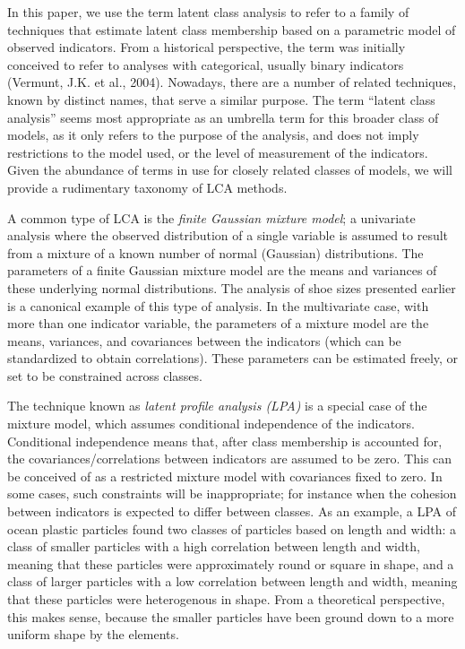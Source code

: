 \documentclass[
  ,man,floatsintext]{apa6}
\begin{document}
In this paper, we use the term latent class analysis to refer to
a family of techniques that estimate latent class membership
based on a parametric model of observed indicators.
From a historical perspective, the term was initially conceived to
refer to analyses with categorical, usually binary indicators (Vermunt, J.K. et al., 2004).
Nowadays, there are a number of related techniques,
known by distinct names, that serve a similar purpose.
The term ``latent class analysis'' seems most appropriate
as an umbrella term for this broader class of models,
as it only refers to the purpose of the analysis,
and does not imply restrictions to the model used,
or the level of measurement of the indicators.
Given the abundance of terms in use for closely related classes of models,
we will provide a rudimentary taxonomy of LCA methods.

A common type of LCA is the \emph{finite Gaussian mixture model};
a univariate analysis where the observed distribution of a single variable
is assumed to result from a mixture of a known number of normal (Gaussian) distributions.
The parameters of a finite Gaussian mixture model are
the means and variances of these underlying normal distributions.
The analysis of shoe sizes presented earlier is a canonical example of this type of analysis.
In the multivariate case, with more than one indicator variable,
the parameters of a mixture model are the means, variances, and covariances
between the indicators (which can be standardized to obtain correlations).
These parameters can be estimated freely, or set to be constrained across classes.

The technique known as \emph{latent profile analysis (LPA)} is a special case of the mixture model,
which assumes conditional independence of the indicators.
Conditional independence means that, after class membership is accounted for,
the covariances/correlations between indicators are assumed to be zero.
This can be conceived of as a restricted mixture model with covariances fixed to zero.
In some cases, such constraints will be inappropriate;
for instance when the cohesion between indicators is expected to differ between classes.
As an example, a LPA of ocean plastic particles
found two classes of particles based on length and width:
a class of smaller particles with a high correlation between length and width,
meaning that these particles were approximately round or square in shape,
and a class of larger particles with a low correlation between length and width,
meaning that these particles were heterogenous in shape.
From a theoretical perspective, this makes sense,
because the smaller particles have been ground down to a more uniform shape by the elements.
\end{document}
